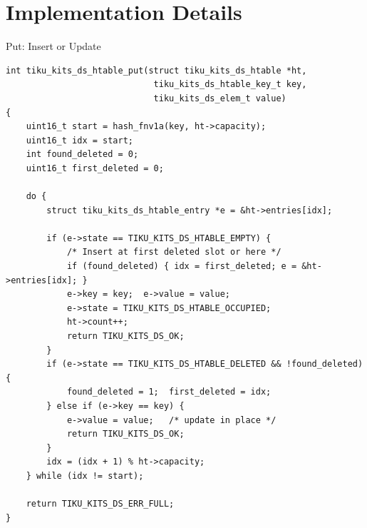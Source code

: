 \documentclass[aspectratio=169, 10pt]{beamer}
\begin{document}
\section{Implementation Details}

\begin{frame}[fragile]{Put: Insert or Update}
\begin{lstlisting}[style=cstyle,
  title={tiku\_kits\_ds\_htable.c --- put (simplified)}]
int tiku_kits_ds_htable_put(struct tiku_kits_ds_htable *ht,
                             tiku_kits_ds_htable_key_t key,
                             tiku_kits_ds_elem_t value)
{
    uint16_t start = hash_fnv1a(key, ht->capacity);
    uint16_t idx = start;
    int found_deleted = 0;
    uint16_t first_deleted = 0;

    do {
        struct tiku_kits_ds_htable_entry *e = &ht->entries[idx];

        if (e->state == TIKU_KITS_DS_HTABLE_EMPTY) {
            /* Insert at first deleted slot or here */
            if (found_deleted) { idx = first_deleted; e = &ht->entries[idx]; }
            e->key = key;  e->value = value;
            e->state = TIKU_KITS_DS_HTABLE_OCCUPIED;
            ht->count++;
            return TIKU_KITS_DS_OK;
        }
        if (e->state == TIKU_KITS_DS_HTABLE_DELETED && !found_deleted) {
            found_deleted = 1;  first_deleted = idx;
        } else if (e->key == key) {
            e->value = value;   /* update in place */
            return TIKU_KITS_DS_OK;
        }
        idx = (idx + 1) % ht->capacity;
    } while (idx != start);

    return TIKU_KITS_DS_ERR_FULL;
}
\end{lstlisting}
\end{frame}
\end{document}
